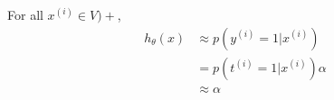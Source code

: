 \begin{answer}
    For all $x^{(i)} \in V)+$, 
$$
    \begin{aligned}
h_\theta(x) &\approx  p(y^{(i)} = 1|x^{(i)}) \\
&= p(t^{(i)} = 1|x^{(i)} ) \alpha\\
&\approx  \alpha
\end{aligned}
$$
\end{answer}
